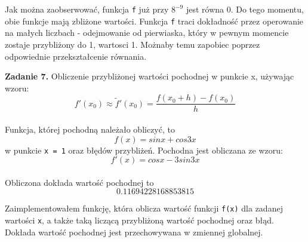 \documentclass[15pt, a4paper]{article}
\begin{document}
Jak można zaobserwować, funkcja \verb|f| już przy $8^{-9}$ jest równa 0. Do tego momentu, obie funkcje mają zbliżone wartości. Funkcja \verb|f| traci dokładność przez operowanie na małych liczbach - odejmowanie od pierwiaska, który w pewnym momencie zostaje przybliżony do 1, wartosci 1. Możnaby temu zapobiec poprzez odpowiednie przekształcenie równania.

\vspace{0.5cm}

\noindent\hrulefill


\vspace{0.5cm}

\noindent\textbf{Zadanie 7.} Obliczenie przybliżonej wartości pochodnej w punkcie x, używając wzoru: \\
\[f'(x_0) \approx \tilde{f}'(x_0) = \frac{f(x_0 + h) - f(x_0)}{h}\] \\
Funkcja, której pochodną należało obliczyć, to 
\[f(x) = sinx + cos3x\]
w punkcie \verb|x = 1| oraz błędów przybliżeń. Pochodna jest obliczana ze wzoru:
\[f'(x) = cosx - 3sin3x \] \\
Obliczona dokłada wartość pochodnej to
\[0.11694228168853815\]

\vspace{0.5cm}

Zaimplementowałem funkcję, która oblicza wartość funkcji \verb|f(x)| dla zadanej wartości \verb|x|, a także taką liczącą przybliżoną wartość pochodnej oraz błąd. Dokłada wartość pochodnej jest przechowywana w zmiennej globalnej.
\end{document}
